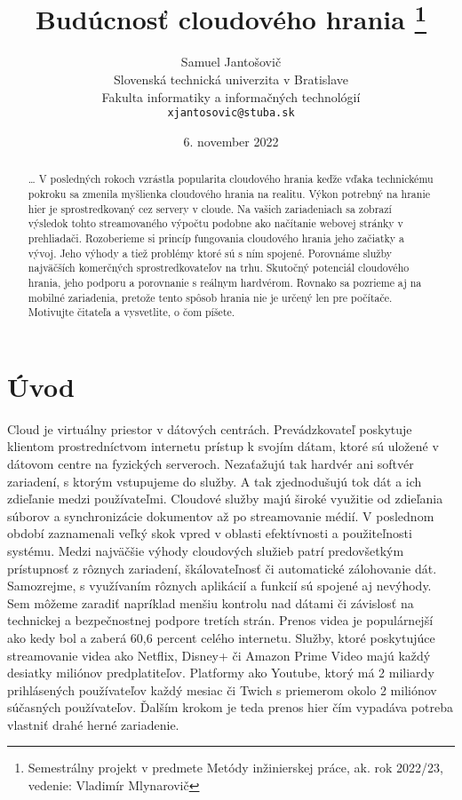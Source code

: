 \documentclass[10pt,twoside,slovak,a4paper]{article}
\title{Budúcnosť cloudového hrania \thanks{Semestrálny projekt v predmete Metódy inžinierskej práce, ak. rok 2022/23, vedenie: Vladimír Mlynarovič}}
\author{Samuel Jantošovič\\[2pt]
	{\small Slovenská technická univerzita v Bratislave}\\
	{\small Fakulta informatiky a informačných technológií}\\
	{\small \texttt{xjantosovic@stuba.sk}}
	}
\date{\small 6. november 2022}
\begin{document}
\maketitle

\begin{abstract}
\ldots
V posledných rokoch vzrástla popularita cloudového hrania keďže vďaka technickému pokroku sa zmenila myšlienka cloudového hrania na realitu. Výkon potrebný na hranie hier je sprostredkovaný cez servery v cloude. Na vašich zariadeniach sa zobrazí výsledok tohto streamovaného výpočtu podobne ako načítanie webovej stránky v prehliadači. Rozoberieme si princíp fungovania cloudového hrania jeho začiatky a vývoj. Jeho výhody a tiež problémy ktoré sú s ním spojené. Porovnáme služby najväčších komerčných sprostredkovateľov na trhu. Skutočný potenciál cloudového hrania, jeho podporu a porovnanie s reálnym hardvérom. Rovnako sa pozrieme aj na mobilné zariadenia, pretože tento spôsob hrania nie je určený len pre počítače. 
Motivujte čitateľa a vysvetlite, o čom píšete.
\end{abstract}

\section{Úvod}
Cloud je virtuálny priestor v dátových centrách. Prevádzkovateľ poskytuje klientom prostredníctvom internetu prístup k svojím dátam, ktoré sú uložené v dátovom centre na fyzických serveroch. Nezaťažujú tak hardvér ani softvér zariadení, s ktorým vstupujeme do služby. A tak zjednodušujú tok dát a ich zdieľanie medzi používateľmi. Cloudové služby majú široké využitie od zdieľania súborov a synchronizácie dokumentov až po streamovanie médií. V poslednom období zaznamenali veľký skok vpred v oblasti efektívnosti a použiteľnosti systému. Medzi najväčšie výhody cloudových služieb patrí predovšetkým prístupnosť z rôznych zariadení, škálovateľnosť či automatické zálohovanie dát. Samozrejme, s využívaním rôznych aplikácií a funkcií sú spojené aj nevýhody. Sem môžeme zaradiť napríklad menšiu kontrolu nad dátami či závislosť na technickej a bezpečnostnej podpore tretích strán. Prenos videa je populárnejší ako kedy bol a zaberá 60,6 percent celého internetu. Služby, ktoré poskytujúce streamovanie videa ako Netflix, Disney+ či Amazon Prime Video majú každý desiatky miliónov predplatiteľov. Platformy ako Youtube, ktorý má 2 miliardy prihlásených používateľov každý mesiac či Twich s priemerom okolo 2 miliónov súčasných používateľov. Ďalším krokom je teda prenos hier čím vypadáva potreba vlastniť drahé herné zariadenie.~\cite{6}
\end{document}
